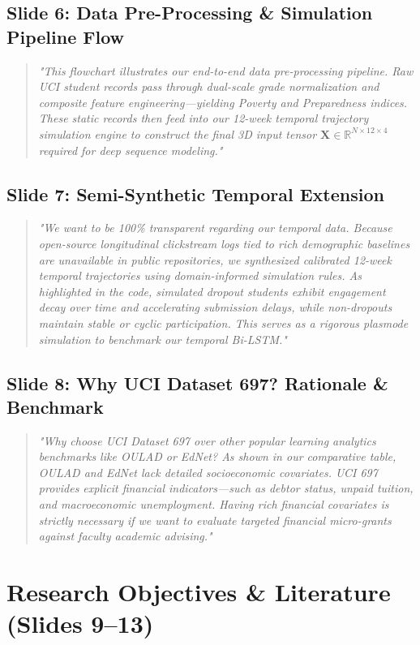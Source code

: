 \documentclass[11pt, a4paper]{article}
\begin{document}
\subsection{Slide 6: Data Pre-Processing \& Simulation Pipeline Flow}
\begin{quote}\small \itshape
"This flowchart illustrates our end-to-end data pre-processing pipeline. Raw UCI student records pass through dual-scale grade normalization and composite feature engineering---yielding Poverty and Preparedness indices. These static records then feed into our 12-week temporal trajectory simulation engine to construct the final 3D input tensor $\mathbf{X} \in \mathbb{R}^{N \times 12 \times 4}$ required for deep sequence modeling."
\end{quote}

\subsection{Slide 7: Semi-Synthetic Temporal Extension}
\begin{quote}\small \itshape
"We want to be 100\% transparent regarding our temporal data. Because open-source longitudinal clickstream logs tied to rich demographic baselines are unavailable in public repositories, we synthesized calibrated 12-week temporal trajectories using domain-informed simulation rules. As highlighted in the code, simulated dropout students exhibit engagement decay over time and accelerating submission delays, while non-dropouts maintain stable or cyclic participation. This serves as a rigorous plasmode simulation to benchmark our temporal Bi-LSTM."
\end{quote}

\subsection{Slide 8: Why UCI Dataset 697? Rationale \& Benchmark}
\begin{quote}\small \itshape
"Why choose UCI Dataset 697 over other popular learning analytics benchmarks like OULAD or EdNet? As shown in our comparative table, OULAD and EdNet lack detailed socioeconomic covariates. UCI 697 provides explicit financial indicators---such as debtor status, unpaid tuition, and macroeconomic unemployment. Having rich financial covariates is strictly necessary if we want to evaluate targeted financial micro-grants against faculty academic advising."
\end{quote}

\section{Research Objectives \& Literature (Slides 9--13)}
\end{document}
